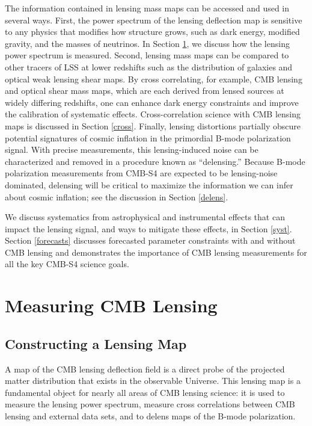 The information contained in lensing mass maps can be accessed and used in several ways.
First, the power spectrum of the lensing deflection map is sensitive to any physics that modifies how structure grows, such as dark energy, modified gravity, and the masses of neutrinos.
In Section \ref{measuringLensing}, we discuss how the lensing power spectrum is measured.
Second, lensing mass maps can be compared to other tracers of LSS at lower redshifts such as the distribution of galaxies and optical weak lensing shear maps.  By cross correlating, for example, CMB lensing and optical shear mass maps, which are each derived from lensed sources at widely differing redshifts, one can enhance dark energy constraints and improve the calibration of systematic effects.
Cross-correlation science with CMB lensing maps is discussed in Section \ref{cross}.
Finally, lensing distortions partially obscure potential signatures of cosmic inflation in the primordial B-mode polarization signal.
With precise measurements, this lensing-induced noise can be characterized and removed in a procedure known as ``delensing.''
Because B-mode polarization measurements from CMB-S4 are expected to be lensing-noise dominated, delensing will be critical to maximize the information we can infer about cosmic inflation; see the discussion in Section \ref{delens}.

We discuss systematics from astrophysical and instrumental effects that can impact the lensing signal, and ways to mitigate these effects, in Section \ref{syst}.  Section \ref{forecasts} discusses forecasted parameter constraints with and without CMB lensing and demonstrates the importance of CMB lensing measurements for all the key CMB-S4 science goals.  


\section{Measuring CMB Lensing}\label{measuringLensing}

\subsection{Constructing a Lensing Map}\label{kappaMap}

A map of the CMB lensing deflection field is a direct probe of the projected matter distribution that exists in the observable Universe. This lensing map is a fundamental object for nearly all areas of CMB lensing science: it is used to measure the lensing power spectrum, measure cross correlations between CMB lensing and external data sets, and to delens maps of the B-mode polarization.  

